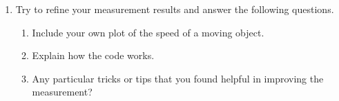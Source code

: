 \documentclass[letterpaper, 11pt]{article}
\begin{document}
\begin{enumerate}
		\item Try to refine your measurement results and answer the following questions. 
			\begin{enumerate}
				\item Include your own plot of the speed of a moving object. 
				
				\item Explain how the code works. 
				
				\item Any particular tricks or tips that you found helpful in improving the measurement?
			\end{enumerate}
		
	\end{enumerate}
\end{document}
